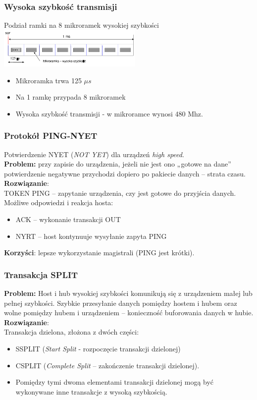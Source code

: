 	\subsubsection{Wysoka szybkość transmisji}
	Podział ramki na 8 mikroramek wysokiej szybkości\\
	\includegraphics[width=7cm]{./wyklady/USB_53_1.pdf}
	\begin{itemize}
		\item Mikroramka trwa 125 $\mu s$
		\item Na 1 ramkę przypada 8 mikroramek
		\item Wysoka szybkość transmisji - w mikroramce wynosi 480 Mhz.
	\end{itemize}
	\subsubsection{Protokół PING-NYET}
	Potwierdzenie NYET (\emph{NOT YET}) dla urządzeń \emph{high speed}.\\
	\textbf{Problem:} przy zapisie do urządzenia, jeżeli nie jest ono „gotowe na dane” potwierdzenie negatywne przychodzi dopiero po pakiecie danych – strata czasu.\\
	\textbf{Rozwiązanie}:\\
	TOKEN PING – zapytanie urządzenia, czy jest gotowe do przyjścia danych.\\
	Możliwe odpowiedzi i reakcja hosta:
	\begin{itemize}
		\item ACK – wykonanie transakcji OUT
		\item NYRT – host kontynuuje wysyłanie zapyta PING
	\end{itemize}
	\textbf{Korzyści}: lepsze wykorzystanie magistrali (PING jest krótki).
	\subsubsection{Transakcja SPLIT}
	\textbf{Problem:} Host i hub wysokiej szybkości komunikują się z urządzeniem małej lub pełnej szybkości. Szybkie przesyłanie danych pomiędzy hostem i hubem oraz wolne pomiędzy hubem i urządzeniem – konieczność buforowania danych w hubie.\\
	\textbf{Rozwiązanie}:\\
	Transakcja dzielona, złożona z dwóch części:
	\begin{itemize}
		\item SSPLIT (\emph{Start Split} - rozpoczęcie transakcji dzielonej)
		\item CSPLIT (\emph{Complete Split} – zakończenie transakcji dzielonej).
		\item Pomiędzy tymi dwoma elementami transakcji dzielonej mogą być wykonywane inne transakcje z wysoką szybkością.
	\end{itemize}
